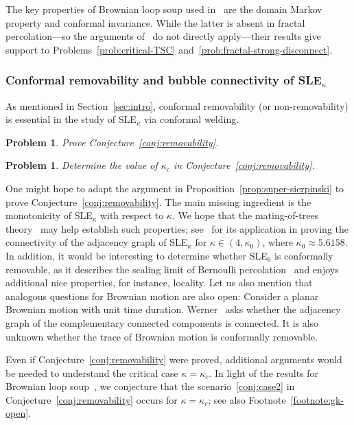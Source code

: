 \documentclass[a4paper]{article}
\numberwithin{equation}{section}
\newtheorem{prob}[theorem]{\bf Problem}
\numberwithin{equation}{section}
\renewcommand{\1}{\mathbf{1}}
\begin{document}
The key properties of Brownian loop soup used in~\cite{SW-CLE} are the domain Markov property and conformal invariance. While the latter is absent in fractal percolation---so the arguments of~\cite{SW-CLE} do not directly apply---their results give support to Problems~\ref{prob:critical-TSC} and~\ref{prob:fractal-strong-disconnect}.

\subsubsection*{Conformal removability and bubble connectivity of SLE$_\kappa$}

As mentioned in Section~\ref{sec:intro}, conformal removability (or non-removability) is essential in the study of SLE$_\kappa$ via conformal welding.
    
\begin{prob}
    Prove Conjecture~\ref{conj:removability}.
\end{prob}

\begin{prob}
    Determine the value of $\kappa_c$ in Conjecture~\ref{conj:removability}.
\end{prob}

One might hope to adapt the argument in Proposition~\ref{prop:super-sierpinski} to prove Conjecture~\ref{conj:removability}. The main missing ingredient is the monotonicity of SLE$_\kappa$ with respect to $\kappa$.
We hope that the mating-of-trees theory~\cite{DMS21-LQG-MRT} may help establish such properties; see~\cite{GP20-connectivity} for its application in proving the connectivity of the adjacency graph of SLE$_\kappa$ for $\kappa \in (4,\kappa_0)$, where $\kappa_0 \approx 5.6158$. In addition, it would be interesting to determine whether SLE$_6$ is conformally removable, as it describes the scaling limit of Bernoulli percolation~\cite{Smirnov-per} and enjoys additional nice properties, for instance, locality. Let us also mention that analogous questions for Brownian motion are also open: Consider a planar Brownian motion with unit time duration. Werner~\cite[Open problem 4]{MP-brownian-motion-book} asks whether the adjacency graph of the complementary connected components is connected. It is also unknown whether the trace of Brownian motion is conformally removable.

Even if Conjecture~\ref{conj:removability} were proved, additional arguments would be needed to understand the critical case $\kappa = \kappa_c$. In light of the results for Brownian loop soup~\cite{SW-CLE}, we conjecture that the scenario~\eqref{conj:case2} in Conjecture~\ref{conj:removability} occurs for $\kappa = \kappa_c$; see also Footnote~\ref{footnote:gk-open}.
\end{document}
